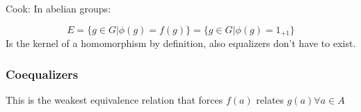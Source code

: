 \documentclass[../../notes.tex]{subfiles}
\begin{document}
Cook: In abelian groups:
$$ E = \{g \in G | \phi (g) = f(g)\} = \{g \in G | \phi (g) = 1_{+1}\} $$
Is the kernel of a homomorphism by definition, also equalizers don't have to exist.

\subsubsection{Coequalizers}

This is the weakest equivalence relation that forces $f(a)$ relates $g(a) \forall a \in A$
\end{document}
